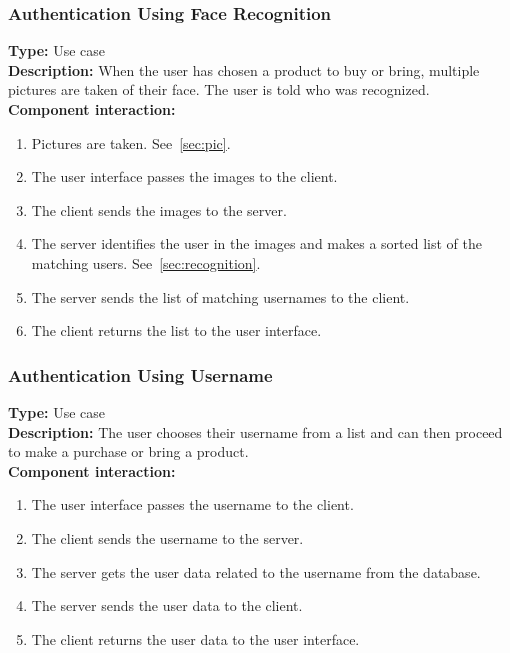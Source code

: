\documentclass[11pt]{article}
\begin{document}
\subsubsection{Authentication Using Face Recognition}
\textbf{Type:} Use case\\
\textbf{Description:} When the user has chosen a product to buy or bring, 
multiple pictures are taken of their face. The user is told who was recognized. \\
\textbf{Component interaction:} 
\begin{enumerate} 
\item{Pictures are taken. See~\ref{sec:pic}.}
\item{The user interface passes the images to the client.}
\item{The client sends the images to the server.}
\item{The server identifies the user in the images and makes a sorted list of the matching users. See~\ref{sec:recognition}.}
\item{The server sends the list of matching usernames to the client.}
\item{The client returns the list to the user interface.}
\end{enumerate}

\subsubsection{Authentication Using Username}
\textbf{Type:} Use case\\
\textbf{Description:} The user chooses their username from a list and can then proceed to make a purchase or bring a product.\\
\textbf{Component interaction:} 
\begin{enumerate} 
\item{The user interface passes the username to the client.}
\item{The client sends the username to the server.}
\item{The server gets the user data related to the username from the database.}
\item{The server sends the user data to the client.}
\item{The client returns the user data to the user interface.}
\end{enumerate}
\end{document}

